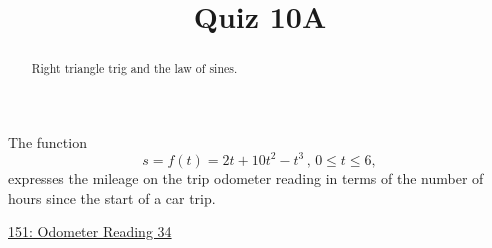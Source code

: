 \documentclass{ximera}
\title{Quiz 10A}
\begin{document}
\begin{abstract}
Right triangle trig and the law of sines.
\end{abstract}
\maketitle



\begin{question}  \label{ExLKDremdmm}
The function
\[
    s = f(t) = 2t+10t^{2}-t^{3} \, , \, 0\leq t\leq 6 ,
\]
expresses the mileage on the trip odometer reading in terms of the number of hours since the start of a car trip.

\begin{onlineOnly}
    \begin{center}
\end{center}
\end{onlineOnly}

\href{https://www.desmos.com/calculator/t1ruocrgm4}{151: Odometer Reading 34}

\end{question}
\end{document}
